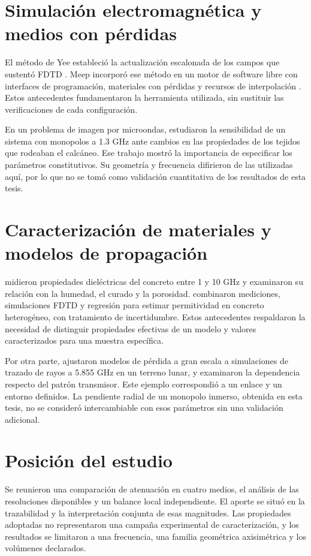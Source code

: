 \section{Simulación electromagnética y medios con pérdidas}
El método de Yee estableció la actualización escalonada de los campos que sustentó FDTD \citep{Yee1966}. Meep incorporó ese método en un motor de software libre con interfaces de programación, materiales con pérdidas y recursos de interpolación \citep{Oskooi2010}. Estos antecedentes fundamentaron la herramienta utilizada, sin sustituir las verificaciones de cada configuración.

En un problema de imagen por microondas, \citet{Fajardo2017} estudiaron la sensibilidad de un sistema con monopolos a 1.3 GHz ante cambios en las propiedades de los tejidos que rodeaban el calcáneo. Ese trabajo mostró la importancia de especificar los parámetros constitutivos. Su geometría y frecuencia difirieron de las utilizadas aquí, por lo que no se tomó como validación cuantitativa de los resultados de esta tesis.

\section{Caracterización de materiales y modelos de propagación}
\citet{fichte2021} midieron propiedades dieléctricas del concreto entre 1 y 10 GHz y examinaron su relación con la humedad, el curado y la porosidad. \citet{wang2024} combinaron mediciones, simulaciones FDTD y regresión para estimar permitividad en concreto heterogéneo, con tratamiento de incertidumbre. Estos antecedentes respaldaron la necesidad de distinguir propiedades efectivas de un modelo y valores caracterizados para una muestra específica.

Por otra parte, \citet{jones2026} ajustaron modelos de pérdida a gran escala a simulaciones de trazado de rayos a 5.855 GHz en un terreno lunar, y examinaron la dependencia respecto del patrón transmisor. Este ejemplo correspondió a un enlace y un entorno definidos. La pendiente radial de un monopolo inmerso, obtenida en esta tesis, no se consideró intercambiable con esos parámetros sin una validación adicional.

\section{Posición del estudio}
Se reunieron una comparación de atenuación en cuatro medios, el análisis de las resoluciones disponibles y un balance local independiente. El aporte se situó en la trazabilidad y la interpretación conjunta de esas magnitudes. Las propiedades adoptadas no representaron una campaña experimental de caracterización, y los resultados se limitaron a una frecuencia, una familia geométrica axisimétrica y los volúmenes declarados.

